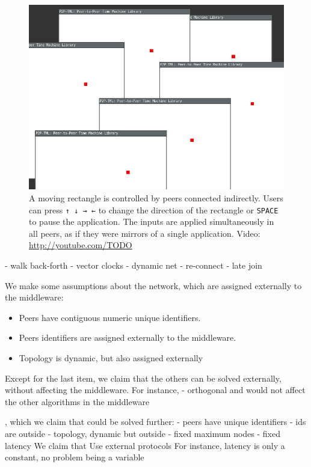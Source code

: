 \documentclass[10pt,journal,compsoc]{IEEEtran}
\newcommand{\code}[1]  {\texttt{\footnotesize{#1}}}
\begin{document}
\begin{figure}[t]
    \centering
    \includegraphics[width=\linewidth]{move}
    \caption[XXX] {
        A moving rectangle is controlled by peers connected indirectly.
        Users can press \code{↑ ↓ → ←} to change the direction of the
        rectangle or \code{SPACE} to pause the application.
        The inputs are applied simultaneously in all peers, as if they were
        mirrors of a single application.
        Video: \url{http://youtube.com/TODO}
        \label{fig.move}
    }
\end{figure}

- walk back-forth
- vector clocks
- dynamic net
- re-connect
- late join

We make some assumptions about the network, which are assigned externally to
the middleware:
%
\begin{itemize}
\item Peers have contiguous numeric unique identifiers.
\item Peers identifiers are assigned externally to the middleware.
\item Topology is dynamic, but also assigned externally

\end{itemize}
%
Except for the last item, we claim that the others can be solved externally,
without affecting the middleware.
For instance,
- orthogonal and would not affect the other algorithms in the middleware

, which we claim that could be
solved further:
- peers have unique identifiers
- ids are outside
- topology, dynamic but outside
- fixed maximum nodes
- fixed latency
We claim that Use external protocols
For instance, latency is only a constant, no problem being a variable
\end{document}
